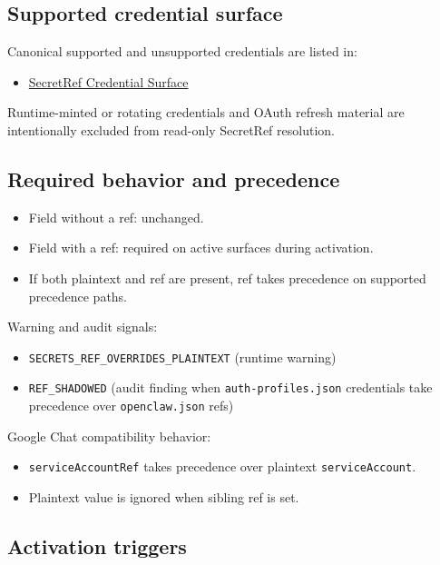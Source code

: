 \subsection{Supported credential surface}


Canonical supported and unsupported credentials are listed in:

\begin{itemize}
  \item \href{/reference/secretref-credential-surface}{SecretRef Credential Surface}
\end{itemize}


Runtime-minted or rotating credentials and OAuth refresh material are intentionally excluded from read-only SecretRef resolution.

\subsection{Required behavior and precedence}


\begin{itemize}
  \item Field without a ref: unchanged.
  \item Field with a ref: required on active surfaces during activation.
  \item If both plaintext and ref are present, ref takes precedence on supported precedence paths.
\end{itemize}


Warning and audit signals:

\begin{itemize}
  \item \texttt{SECRETS\_REF\_OVERRIDES\_PLAINTEXT} (runtime warning)
  \item \texttt{REF\_SHADOWED} (audit finding when \texttt{auth-profiles.json} credentials take precedence over \texttt{openclaw.json} refs)
\end{itemize}


Google Chat compatibility behavior:

\begin{itemize}
  \item \texttt{serviceAccountRef} takes precedence over plaintext \texttt{serviceAccount}.
  \item Plaintext value is ignored when sibling ref is set.
\end{itemize}


\subsection{Activation triggers}


